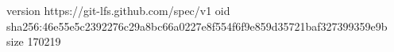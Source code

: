 version https://git-lfs.github.com/spec/v1
oid sha256:46e55e5c2392276c29a8bc66a0227e8f554f6f9e859d35721baf327399359e9b
size 170219
